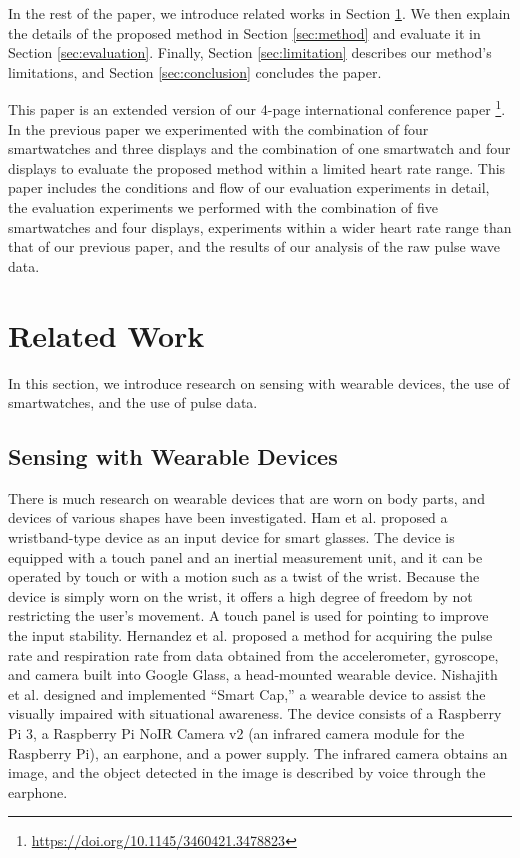 \documentclass{ieeeaccess}
\begin{document}
In the rest of the paper, we introduce related works in Section \ref{sec:related}. We then explain the details of the proposed method in Section \ref{sec:method} and evaluate it in Section \ref{sec:evaluation}. Finally, Section \ref{sec:limitation} describes our method's limitations, and Section \ref{sec:conclusion} concludes the paper.\par

This paper is an extended version of our 4-page international conference paper \cite{disp2ppg}\footnote{\url{https://doi.org/10.1145/3460421.3478823}}. In the previous paper we experimented with the combination of four smartwatches and three displays and the combination of one smartwatch and four displays to evaluate the proposed method within a limited heart rate range. This paper includes the conditions and flow of our evaluation experiments in detail, the evaluation experiments we performed with the combination of five smartwatches and four displays, experiments within a wider heart rate range than that of our previous paper, and the results of our analysis of the raw pulse wave data.

\section{Related Work}
\label{sec:related}
In this section, we introduce research on sensing with wearable devices, the use of smartwatches, and the use of pulse data.

\subsection{Sensing with Wearable Devices}
There is much research on wearable devices that are worn on body parts, and devices of various shapes have been investigated. Ham et al. \cite{smart_wristband} proposed a wristband-type device as an input device for smart glasses. The device is equipped with a touch panel and an inertial measurement unit, and it can be operated by touch or with a motion such as a twist of the wrist. Because the device is simply worn on the wrist, it offers a high degree of freedom by not restricting the user's movement. A touch panel is used for pointing to improve the input stability. Hernandez et al. \cite{bioglass} proposed a method for acquiring the pulse rate and respiration rate from data obtained from the accelerometer, gyroscope, and camera built into Google Glass, a head-mounted wearable device. Nishajith et al. \cite{smart_cap} designed and implemented ``Smart Cap,'' a wearable device to assist the visually impaired with situational awareness. The device consists of a Raspberry Pi 3, a Raspberry Pi NoIR Camera v2 (an infrared camera module for the Raspberry Pi), an earphone, and a power supply. The infrared camera obtains an image, and the object detected in the image is described by voice through the earphone.\par
\end{document}

